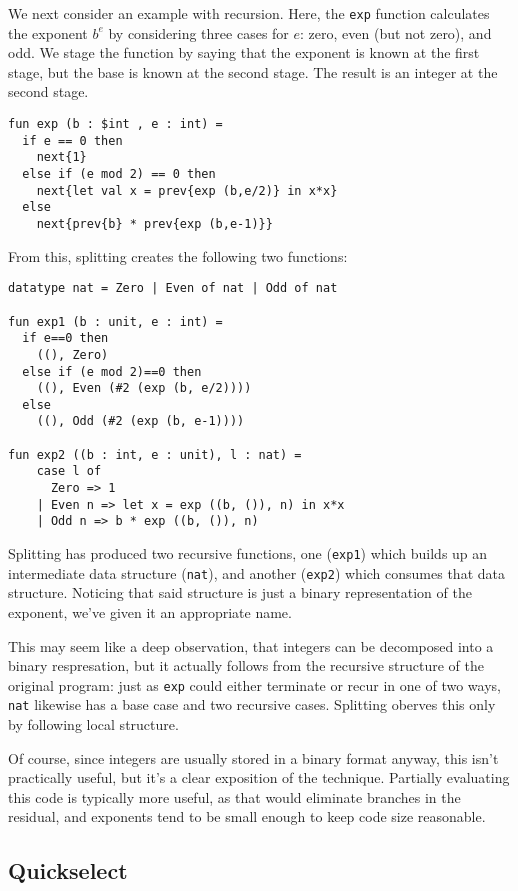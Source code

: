 We next consider an example with recursion.
Here, the \texttt{exp} function calculates the exponent $b^e$
by considering three cases for $e$: zero, even (but not zero), and odd.
We stage the function by saying that the exponent is known at the first stage,
but the base is known at the second stage.
The result is an integer at the second stage.
\begin{lstlisting} 
fun exp (b : $int , e : int) = 
  if e == 0 then 
    next{1} 
  else if (e mod 2) == 0 then
    next{let val x = prev{exp (b,e/2)} in x*x} 
  else 
    next{prev{b} * prev{exp (b,e-1)}}
\end{lstlisting}
\noindent
From this, splitting creates the following two functions:
\begin{lstlisting} 
datatype nat = Zero | Even of nat | Odd of nat

fun exp1 (b : unit, e : int) =
  if e==0 then
    ((), Zero)
  else if (e mod 2)==0 then 
    ((), Even (#2 (exp (b, e/2))))
  else 
    ((), Odd (#2 (exp (b, e-1))))

fun exp2 ((b : int, e : unit), l : nat) = 
    case l of
      Zero => 1
    | Even n => let x = exp ((b, ()), n) in x*x 
    | Odd n => b * exp ((b, ()), n)
\end{lstlisting}
Splitting has produced two recursive functions,
one (\texttt{exp1}) which builds up an intermediate data structure (\texttt{nat}),
and another (\texttt{exp2}) which consumes that data structure.  
Noticing that said structure is just a binary representation of the exponent,
we've given it an appropriate name.

This may seem like a deep observation, 
that integers can be decomposed into a binary respresation,
but it actually follows from the recursive structure of the original program:
just as \texttt{exp} could either terminate or recur in one of two ways,
\texttt{nat} likewise has a base case and two recursive cases.
Splitting oberves this only by following local structure.

Of course, since integers are usually stored in a binary format anyway, 
this isn't practically useful, but it's a clear exposition of the technique.
Partially evaluating this code is typically more useful,
as that would eliminate branches in the residual,
and exponents tend to be small enough to keep code size reasonable.

\subsection{Quickselect}

